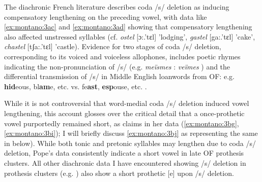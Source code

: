 \documentclass[output=paper,colorlinks,citecolor=brown,
]{langscibook}
\begin{document}
\noindent 
The diachronic French literature \citep{Pope1952, Nyrop1914, Bourciez1955, Gess1998, Gess1999} describes coda /s/ deletion as inducing compensatory lengthening on the preceding vowel, with data like \ref{ex:montano:3ac} and \ref{ex:montano:3ad} showing that compensatory lengthening also affected unstressed syllables (cf. \textit{ostel} [ɔ:.'tɛl] 'lodging', \textit{gastel} [ga:.'tɛl] 'cake', \textit{chastel} [tʃa:.'tɛl] 'castle).  Evidence for two stages of coda /s/ deletion, corresponding to its voiced and voiceless allophones, includes poetic rhymes indicating the non-pronunciation of /s/ (e.g. \textit{meïsmes} : \textit{veïmes} \citep{Pope1952}) and the differential transmission of /s/ in Middle English loanwords from OF: e.g. \textbf{hid}eous, bl\textbf{am}e, etc. vs. fe\textbf{ast}, \textbf{esp}ouse, etc. \citep{Pope1952, Gess1999}.

While it is not controversial that word-medial coda /s/ deletion induced vowel lengthening, this account glosses over the critical detail that a once-prothetic vowel purportedly remained short, as \citet{Pope1952} claims in her data (\ref{ex:montano:3bg},\ref{ex:montano:3bi}); I will briefly discuss \ref{ex:montano:3bj} as representing the same in  below).  While both tonic and pretonic syllables may lengthen due to coda /s/ deletion, Pope's data consistently indicate a short vowel in late OF prothesis clusters.  All other diachronic data I have encountered showing /s/ deletion in prothesis clusters (e.g. \citet{Nyrop1914, Bourciez1955}) also show a short prothetic [e] upon /s/ deletion.
\end{document}
